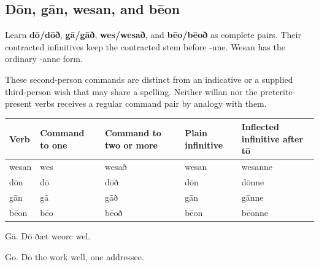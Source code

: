 \subsection*{Dōn, gān, wesan, and bēon}

Learn \textbf{dō/\allowbreak{}dōð}, \textbf{gā/\allowbreak{}gāð}, \textbf{wes/\allowbreak{}wesað}, and \textbf{bēo/\allowbreak{}bēoð} as complete pairs. Their contracted infinitives keep the contracted stem before -nne. Wesan has the ordinary -anne form.

These second-person commands are distinct from an indicative or a supplied third-person wish that may share a spelling. Neither willan nor the preterite-present verbs receives a regular command pair by analogy with them.

\par\begingroup
\fontsize{10.5}{13.2}\selectfont
\setlength{\LTleft}{0pt}\setlength{\LTright}{\fill}
\noindent
\begin{tabular}{@{}>{\raggedright\arraybackslash}p{17.31mm}>{\raggedright\arraybackslash}p{17.57mm}>{\raggedright\arraybackslash}p{23.8mm}>{\raggedright\arraybackslash}p{21.98mm}>{\raggedright\arraybackslash}p{32.1mm}@{}}
\toprule
\textbf{Verb} & \textbf{Command to one} & \textbf{Command to two or more} & \textbf{Plain infinitive} & \textbf{Inflected infinitive after tō} \\
\midrule
wesan & wes & wesað & wesan & wesanne \\
dōn & dō & dōð & dōn & dōnne \\
gān & gā & gāð & gān & gānne \\
bēon & bēo & bēoð & bēon & bēonne \\
\bottomrule
\end{tabular}
\par\endgroup

Gā. Dō ðæt weorc wel.

Go. Do the work well, one addressee.

